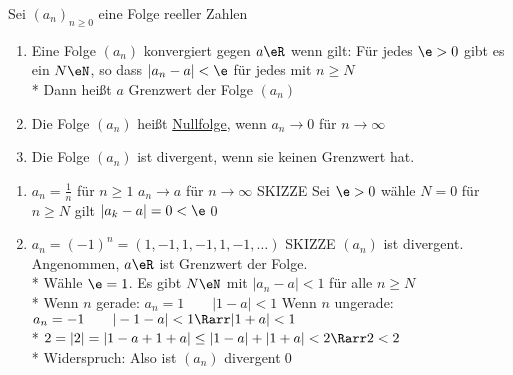 Sei $(a_n)_{n\geq 0}$ eine Folge reeller Zahlen
\begin{enumerate}
\item{Eine Folge $(a_n)$ konvergiert gegen $a\eR$ wenn gilt: Für jedes $\e>0$ gibt es ein $N\eN$, so dass $|a_n-a|<\e$ für jedes \nN{} mit $n\geq N$\\*
Dann heißt $a$ Grenzwert der Folge $(a_n)$
}
\item{Die Folge $(a_n)$ heißt \ul{Nullfolge}, wenn $a_n→0$ für $n→∞$}
\item{Die Folge $(a_n)$ ist divergent, wenn sie keinen Grenzwert hat.}
\end{enumerate}
%
\bsp
\begin{enumerate}
\item{$a_n=\frac{1}{n}$ für $n\geq 1$
 $a_n→a$ für $n→∞$ SKIZZE %
\bew
Sei $\e>0$ wähle $N=0$ für $n\geq N$ gilt $|a_k-a|=0<\e$\qed}
\item{$a_n=(-1)^n=(1,-1,1,-1,1,-1,…)$ SKIZZE %
 $(a_n)$ ist divergent. 
\bew
Angenommen, $a\eR$ ist Grenzwert der Folge.\\*
Wähle $\e=1$. Es gibt $N\eN$ mit $|a_n-a|<1$ für alle $n\geq N$\\*
Wenn $n$ gerade: $a_n=1\qquad |1-a|<1$
Wenn $n$ ungerade: $a_n=-1\qquad |-1-a|<1 \Rarr |1+a|<1$\\*
$2=|2|=|1-a+1+a|\leq |1-a|+|1+a|<2 \Rarr 2<2$\\*
Widerspruch: Also ist $(a_n)$ divergent\qed}
\end{enumerate}